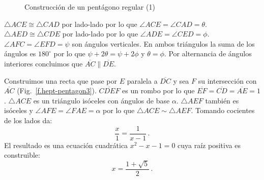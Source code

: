 \begin{figure}[t]
\begin{center}
\end{center}
\caption{Construcción de un pentágono regular (1)}\label{f.hept-pentagon2}
\end{figure}
$\triangle ACE\cong \triangle CAD$ por lado-lado por lo que $\angle ACE=\angle CAD=\theta$. $\triangle AED\cong\triangle CDE$ por lado-lado por lo que $\angle ADE=\angle CED=\phi$. $\angle AFC=\angle EFD=\psi$ son ángulos verticales. En ambos triángulos la suma de los ángulos es $180^\circ$ por lo que
$\psi+2\theta=\psi+ 2\phi$ y $\theta=\phi$.
Por alternancia de ángulos interiores concluimos que $\overline{AC}\parallel \overline{DE}$.

Construimos una recta que pase por $E$ paralela a $\overline{DC}$ y sea $F$ su intersección con $\overline{AC}$ (Fig.~\ref{f.hept-pentagon3}). $\overline{CDEF}$ es un rombo por lo que $\overline{EF}=\overline{CD}=\overline{AE}=1$. $\triangle ACE$ es un triángulo isóceles con ángulos de base $\alpha$. $\triangle AEF$ también es isóceles y $\angle AFE=\angle FAE=\alpha$ por lo que $\triangle ACE\sim\triangle AEF$. Tomando cocientes de los lados da:
\[
\frac{x}{1}=\frac{1}{x-1}\,.
\]
El resultado es una ecuación cuadrática $x^2-x-1=0$
cuya raíz positiva es construible:
\[
x=\frac{1+\sqrt{5}}{2}\,.
\]

